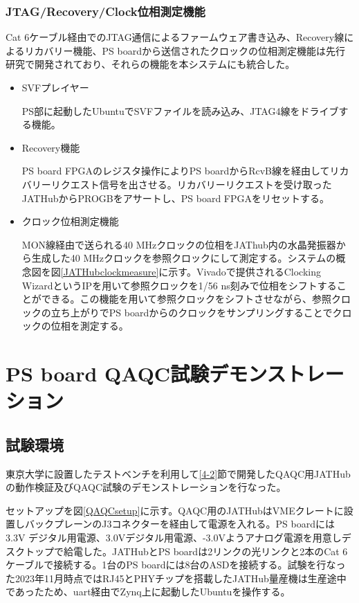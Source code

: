 \subsubsection{JTAG/Recovery/Clock位相測定機能}
\label{subsubsec_jtagrecovery}
Cat 6ケーブル経由でのJTAG通信によるファームウェア書き込み、Recovery線によるリカバリー機能、PS boardから送信されたクロックの位相測定機能は先行研究で開発されており、それらの機能を本システムにも統合した。
\begin{itemize}
    \item SVFプレイヤー \par
    PS部に起動したUbuntuでSVFファイルを読み込み、JTAG4線をドライブする機能。
    \baselineskip

    \item Recovery機能 \par
    PS board FPGAのレジスタ操作によりPS boardからRcvB線を経由してリカバリーリクエスト信号を出させる。リカバリーリクエストを受け取ったJATHubからPROGBをアサートし、PS board FPGAをリセットする。
    \baselineskip
    
    \item クロック位相測定機能 \par
    MON線経由で送られる40 MHzクロックの位相をJAThub内の水晶発振器から生成した40 MHzクロックを参照クロックにして測定する。システムの概念図を図\ref{JATHubclockmeasure}\cite{mt_atanaka}に示す。Vivadoで提供されるClocking WizardというIPを用いて参照クロックを1/56 ns刻みで位相をシフトすることができる。この機能を用いて参照クロックをシフトさせながら、参照クロックの立ち上がりでPS boardからのクロックをサンプリングすることでクロックの位相を測定する。
    \baselineskip

\end{itemize}

\section{PS board QAQC試験デモンストレーション}
\label{sec_PSboardQAQCdemo}

\subsection{試験環境}
\label{subsec_testenv}
東京大学に設置したテストベンチを利用して\ref{4-2}節で開発したQAQC用JATHubの動作検証及びQAQC試験のデモンストレーションを行なった。

セットアップを図\ref{QAQCsetup}に示す。QAQC用のJATHubはVMEクレートに設置しバックプレーンのJ3コネクターを経由して電源を入れる。PS boardには3.3V デジタル用電源、3.0Vデジタル用電源、-3.0Vようアナログ電源を用意しデスクトップで給電した。JATHubとPS boardは2リンクの光リンクと2本のCat 6ケーブルで接続する。1台のPS boardには8台のASDを接続する。試験を行なった2023年11月時点ではRJ45とPHYチップを搭載したJATHub量産機は生産途中であったため、uart経由でZynq上に起動したUbuntuを操作する。

